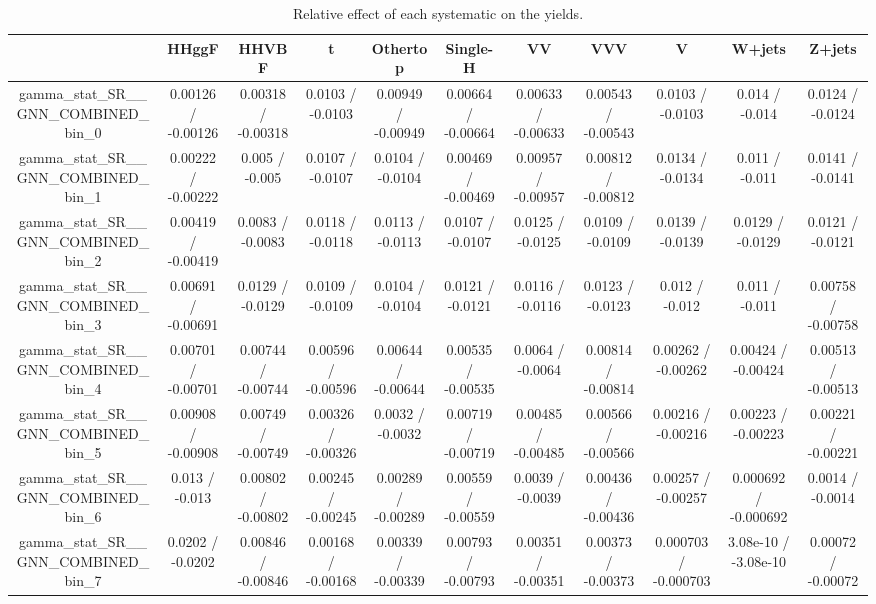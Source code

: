 \documentclass[10pt]{article}
\begin{document}
\begin{table}[htbp]
\begin{center}
\begin{tabular}{|c|c|c|c|c|c|c|c|c|c|c|}
\hline 
      & HHggF      & HHVBF      & t      & Othertop      & Single-H      & VV      & VVV      & V      & W+jets      & Z+jets \\ 
\hline 
  gamma_stat_SR__GNN_COMBINED_bin_0 & 0.00126 / -0.00126 & 0.00318 / -0.00318 & 0.0103 / -0.0103 & 0.00949 / -0.00949 & 0.00664 / -0.00664 & 0.00633 / -0.00633 & 0.00543 / -0.00543 & 0.0103 / -0.0103 & 0.014 / -0.014 & 0.0124 / -0.0124 \\ 
  gamma_stat_SR__GNN_COMBINED_bin_1 & 0.00222 / -0.00222 & 0.005 / -0.005 & 0.0107 / -0.0107 & 0.0104 / -0.0104 & 0.00469 / -0.00469 & 0.00957 / -0.00957 & 0.00812 / -0.00812 & 0.0134 / -0.0134 & 0.011 / -0.011 & 0.0141 / -0.0141 \\ 
  gamma_stat_SR__GNN_COMBINED_bin_2 & 0.00419 / -0.00419 & 0.0083 / -0.0083 & 0.0118 / -0.0118 & 0.0113 / -0.0113 & 0.0107 / -0.0107 & 0.0125 / -0.0125 & 0.0109 / -0.0109 & 0.0139 / -0.0139 & 0.0129 / -0.0129 & 0.0121 / -0.0121 \\ 
  gamma_stat_SR__GNN_COMBINED_bin_3 & 0.00691 / -0.00691 & 0.0129 / -0.0129 & 0.0109 / -0.0109 & 0.0104 / -0.0104 & 0.0121 / -0.0121 & 0.0116 / -0.0116 & 0.0123 / -0.0123 & 0.012 / -0.012 & 0.011 / -0.011 & 0.00758 / -0.00758 \\ 
  gamma_stat_SR__GNN_COMBINED_bin_4 & 0.00701 / -0.00701 & 0.00744 / -0.00744 & 0.00596 / -0.00596 & 0.00644 / -0.00644 & 0.00535 / -0.00535 & 0.0064 / -0.0064 & 0.00814 / -0.00814 & 0.00262 / -0.00262 & 0.00424 / -0.00424 & 0.00513 / -0.00513 \\ 
  gamma_stat_SR__GNN_COMBINED_bin_5 & 0.00908 / -0.00908 & 0.00749 / -0.00749 & 0.00326 / -0.00326 & 0.0032 / -0.0032 & 0.00719 / -0.00719 & 0.00485 / -0.00485 & 0.00566 / -0.00566 & 0.00216 / -0.00216 & 0.00223 / -0.00223 & 0.00221 / -0.00221 \\ 
  gamma_stat_SR__GNN_COMBINED_bin_6 & 0.013 / -0.013 & 0.00802 / -0.00802 & 0.00245 / -0.00245 & 0.00289 / -0.00289 & 0.00559 / -0.00559 & 0.0039 / -0.0039 & 0.00436 / -0.00436 & 0.00257 / -0.00257 & 0.000692 / -0.000692 & 0.0014 / -0.0014 \\ 
  gamma_stat_SR__GNN_COMBINED_bin_7 & 0.0202 / -0.0202 & 0.00846 / -0.00846 & 0.00168 / -0.00168 & 0.00339 / -0.00339 & 0.00793 / -0.00793 & 0.00351 / -0.00351 & 0.00373 / -0.00373 & 0.000703 / -0.000703 & 3.08e-10 / -3.08e-10 & 0.00072 / -0.00072 \\ 
\hline 
\end{tabular} 
\caption{Relative effect of each systematic on the yields.} 
\end{center} 
\end{table} 
\end{document}
